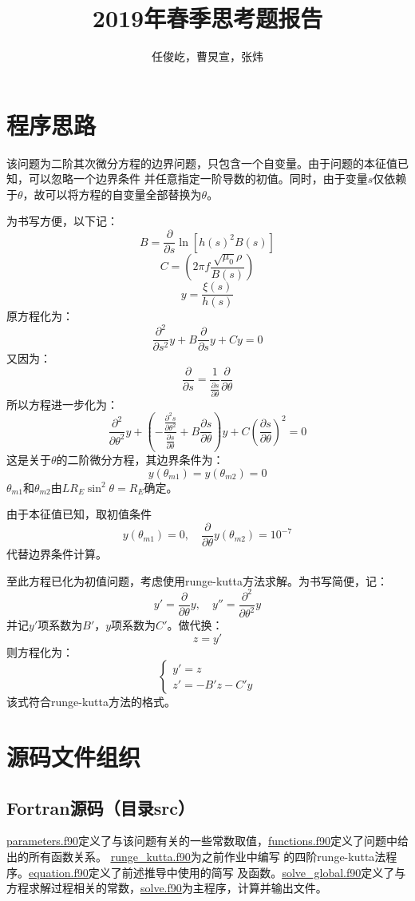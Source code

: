 \documentclass{ctexart}
\title{2019年春季思考题报告}
\author{任俊屹，曹炅宣，张炜}
\date{}
\def\file#1#2{\href{#1/#2}{\underline{#2}}}
\begin{document}
\maketitle

\section{程序思路}
    该问题为二阶其次微分方程的边界问题，只包含一个自变量。由于问题的本征值已知，可以忽略一个边界条件
    并任意指定一阶导数的初值。同时，由于变量$s$仅依赖于$\theta$，故可以将方程的自变量全部替换为$\theta$。

    为书写方便，以下记：
    \[B=\frac{\partial}{\partial s}\ln \left[h(s)^2B(s)\right]\]
    \[C=\left(2\pi f\frac{\sqrt{\mu_0}{\rho}}{B(s)}\right)\]
    \[y=\frac{\xi(s)}{h(s)}\]
    原方程化为：
    \[\frac{\partial^2}{\partial s^2}y+B\frac{\partial}{\partial s}y+Cy=0\]
    又因为：
    \[\frac{\partial}{\partial s}=\frac{1}{\frac{\partial s}{\partial\theta}}\frac{\partial}{\partial\theta}\]
    所以方程进一步化为：
    \[\frac{\partial^2}{\partial\theta^2}y+\left(-\frac{\frac{\partial^2s}{\partial\theta^2}}{\frac{\partial s}{\partial\theta}}+
      B\frac{\partial s}{\partial\theta}\right)y+C\left(\frac{\partial s}{\partial\theta}\right)^2=0\]
    这是关于$\theta$的二阶微分方程，其边界条件为：
    \[y(\theta_{m1})=y(\theta_{m2})=0\]
    $\theta_{m1}$和$\theta_{m2}$由$LR_E\sin^2\theta=R_E$确定。

    由于本征值已知，取初值条件
    \[y(\theta_{m1})=0, \quad \frac{\partial}{\partial\theta}y(\theta_{m2})=10^{-7}\]
    代替边界条件计算。

    至此方程已化为初值问题，考虑使用runge-kutta方法求解。为书写简便，记：
    \[y'=\frac{\partial}{\partial\theta}y, \quad y''=\frac{\partial^2}{\partial\theta^2}y\]
    并记$y'$项系数为$B'$，$y$项系数为$C'$。做代换：
    \[z=y'\]
    则方程化为：
    \begin{equation*}
        \begin{cases}
            y'=z \\
            z'=-B'z-C'y
        \end{cases}
    \end{equation*}
    该式符合runge-kutta方法的格式。

\section{源码文件组织}
    \subsection{Fortran源码（目录src）}
        \file{src}{parameters.f90}定义了与该问题有关的一些常数取值，\file{src}{functions.f90}定义了问题中给出的所有函数关系。
        \file{src}{runge\_kutta.f90}为之前作业中编写 的四阶runge-kutta法程序。\file{src}{equation.f90}定义了前述推导中使用的简写
        及函数。\file{src}{solve\_global.f90}定义了与方程求解过程相关的常数，\file{src}{solve.f90}为主程序，计算并输出文件。
\end{document}
